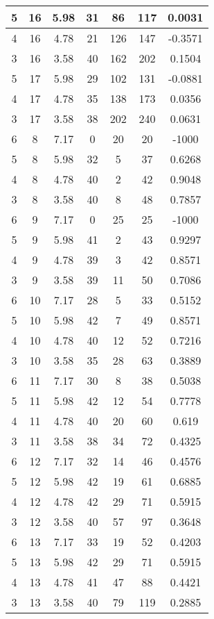 \documentclass[letterpaper, 12pt]{article}
\begin{document}
\begin{longtable}{|c|c|c|c|c|c|c|}
\hline
5 & 16 & 5.98 & 31 & 86 & 117 & 0.0031 \\
\hline
4 & 16 & 4.78 & 21 & 126 & 147 & -0.3571 \\
\hline
3 & 16 & 3.58 & 40 & 162 & 202 & 0.1504 \\
\hline
5 & 17 & 5.98 & 29 & 102 & 131 & -0.0881 \\
\hline
4 & 17 & 4.78 & 35 & 138 & 173 & 0.0356 \\
\hline
3 & 17 & 3.58 & 38 & 202 & 240 & 0.0631 \\
\hline
6 & 8 & 7.17 & 0 & 20 & 20 & -1000 \\
\hline
5 & 8 & 5.98 & 32 & 5 & 37 & 0.6268 \\
\hline
4 & 8 & 4.78 & 40 & 2 & 42 & 0.9048 \\
\hline
3 & 8 & 3.58 & 40 & 8 & 48 & 0.7857 \\
\hline
6 & 9 & 7.17 & 0 & 25 & 25 & -1000 \\
\hline
5 & 9 & 5.98 & 41 & 2 & 43 & 0.9297 \\
\hline
4 & 9 & 4.78 & 39 & 3 & 42 & 0.8571 \\
\hline
3 & 9 & 3.58 & 39 & 11 & 50 & 0.7086 \\
\hline
6 & 10 & 7.17 & 28 & 5 & 33 & 0.5152 \\
\hline
5 & 10 & 5.98 & 42 & 7 & 49 & 0.8571 \\
\hline
4 & 10 & 4.78 & 40 & 12 & 52 & 0.7216 \\
\hline
3 & 10 & 3.58 & 35 & 28 & 63 & 0.3889 \\
\hline
6 & 11 & 7.17 & 30 & 8 & 38 & 0.5038 \\
\hline
5 & 11 & 5.98 & 42 & 12 & 54 & 0.7778 \\
\hline
4 & 11 & 4.78 & 40 & 20 & 60 & 0.619 \\
\hline
3 & 11 & 3.58 & 38 & 34 & 72 & 0.4325 \\
\hline
6 & 12 & 7.17 & 32 & 14 & 46 & 0.4576 \\
\hline
5 & 12 & 5.98 & 42 & 19 & 61 & 0.6885 \\
\hline
4 & 12 & 4.78 & 42 & 29 & 71 & 0.5915 \\
\hline
3 & 12 & 3.58 & 40 & 57 & 97 & 0.3648 \\
\hline
6 & 13 & 7.17 & 33 & 19 & 52 & 0.4203 \\
\hline
5 & 13 & 5.98 & 42 & 29 & 71 & 0.5915 \\
\hline
4 & 13 & 4.78 & 41 & 47 & 88 & 0.4421 \\
\hline
3 & 13 & 3.58 & 40 & 79 & 119 & 0.2885 \\

\end{longtable}
\end{document}
